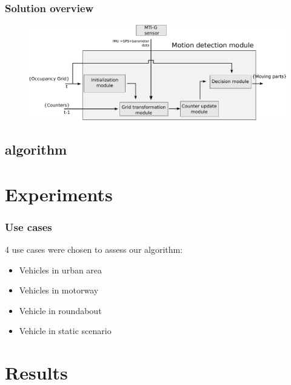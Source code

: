 \documentclass{beamer}
\begin{document}
	\begin{frame}
		\frametitle{Solution overview}
		\begin{figure}[h]
			\center
			\includegraphics[scale=0.27]{../img/fig:motion:framework:motionmodule}
		 \end{figure}
		
	\end{frame}		
	

\subsection{algorithm}


\section{Experiments}

	\begin{frame}
		\frametitle{Use cases}
		4 use cases were chosen to assess our algorithm:
		\begin{itemize}
		\item Vehicles in urban area
		\item Vehicles in motorway
		\item Vehicle in roundabout
		\item Vehicle in static scenario
		\end{itemize}						
	\end{frame}

\section{Results}
\end{document}
